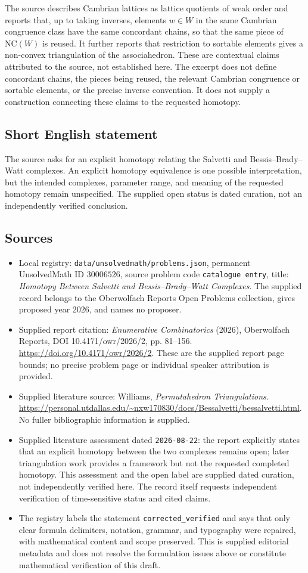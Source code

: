\documentclass[11pt]{article}
\begin{document}
The source describes Cambrian lattices as lattice quotients of weak order and reports that, up to taking inverses, elements \(w\in W\) in the same Cambrian congruence class have the same concordant chains, so that the same piece of \(\mathrm{NC}(W)\) is reused. It further reports that restriction to sortable elements gives a non-convex triangulation of the associahedron. These are contextual claims attributed to the source, not established here. The excerpt does not define concordant chains, the pieces being reused, the relevant Cambrian congruence or sortable elements, or the precise inverse convention. It does not supply a construction connecting these claims to the requested homotopy.
\subsection{Short English statement}
The source asks for an explicit homotopy relating the Salvetti and Bessis--Brady--Watt complexes. An explicit homotopy equivalence is one possible interpretation, but the intended complexes, parameter range, and meaning of the requested homotopy remain unspecified. The supplied open status is dated curation, not an independently verified conclusion.
\subsection{Sources}
\begin{itemize}
\item Local registry: \texttt{data/unsolvedmath/problems.json}, permanent UnsolvedMath ID \(30006526\), source problem code \texttt{catalogue entry}, title: \emph{Homotopy Between Salvetti and Bessis--Brady--Watt Complexes}. The supplied record belongs to the Oberwolfach Reports Open Problems collection, gives proposed year 2026, and names no proposer.
\item Supplied report citation: \emph{Enumerative Combinatorics} (2026), Oberwolfach Reports, DOI 10.4171/owr/2026/2, pp. 81--156. \url{https://doi.org/10.4171/owr/2026/2}. These are the supplied report page bounds; no precise problem page or individual speaker attribution is provided.
\item Supplied literature source: Williams, \emph{Permutahedron Triangulations}. \url{https://personal.utdallas.edu/~nxw170830/docs/Bessalvetti/bessalvetti.html}. No fuller bibliographic information is supplied.
\item Supplied literature assessment dated \texttt{2026-08-22}: the report explicitly states that an explicit homotopy between the two complexes remains open; later triangulation work provides a framework but not the requested completed homotopy. This assessment and the open label are supplied dated curation, not independently verified here. The record itself requests independent verification of time-sensitive status and cited claims.
\item The registry labels the statement \texttt{corrected\_verified} and says that only clear formula delimiters, notation, grammar, and typography were repaired, with mathematical content and scope preserved. This is supplied editorial metadata and does not resolve the formulation issues above or constitute mathematical verification of this draft.
\end{itemize}
\end{document}
